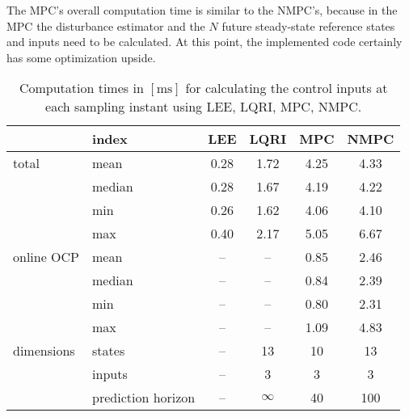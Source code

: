 The MPC's overall computation time is similar to the NMPC's, because in the MPC the disturbance estimator and the $N$ future steady-state reference states and inputs need to be calculated. At this point, the implemented code certainly has some optimization upside.
\begin{table}[h!]
\begin{center}
\caption{Computation times in $[\si{\milli\second}]$ for calculating the control inputs at each sampling instant using LEE, LQRI, MPC, NMPC.}\vspace{1ex}
\label{tab:computation_times}
\begin{tabular}{ll|cccc}
\hline
      & index  & LEE        & LQRI       & MPC        & NMPC       \\ \hline \hline
total & mean   & \num{0.28} & \num{1.72} & \num{4.25} & \num{4.33} \\
      & median & \num{0.28} & \num{1.67} & \num{4.19} & \num{4.22} \\
      & min    & \num{0.26} & \num{1.62} & \num{4.06} & \num{4.10} \\
      & max    & \num{0.40} & \num{2.17} & \num{5.05} & \num{6.67} \\
\hline
online OCP & mean   & -- & -- & \num{0.85} & \num{2.46}\\
           & median & -- & -- & \num{0.84} & \num{2.39}\\
           & min    & -- & -- & \num{0.80} & \num{2.31}\\
           & max    & -- & -- & \num{1.09} & \num{4.83}\\
\hline
dimensions & states & -- & 13 & 10 & 13 \\
 		   & inputs & -- & 3  & 3  & 3  \\
 		   & prediction horizon & -- & $\infty$ & \num{40} & \num{100} \\
\hline
\end{tabular}
\end{center}
\end{table}